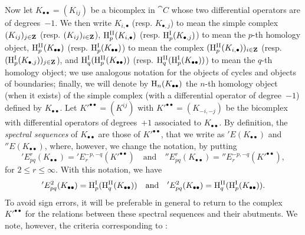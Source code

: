 \begin{env}[11.3.5]
\label{0.11.3.5}
Now let $K_{\bullet\bullet} = (K_{ij})$ be a bicomplex in $\cat{C}$ whose two differential operators are of degrees~$-1$.
We then write $K_{i,\bullet}$ (resp. $K_{\bullet,j}$) to mean the simple complex $(K_{ij})_{j\in\mathbf{Z}}$ (resp. $(K_{ij})_{i\in\mathbf{Z}}$), $\mathrm{H}_{p}^\mathrm{II}(K_{i, \bullet})$ (resp. $\mathrm{H}_{p}^\mathrm{I}(K_{\bullet, j})$) to mean the $p$-th homology object, $\mathrm{H}_{p}^\mathrm{II}(K_{\bullet\bullet})$ (resp. $\mathrm{H}_{p}^\mathrm{I}(K_{\bullet\bullet})$) to mean the complex $(\mathrm{H}_{p}^\mathrm{II}(K_{i, \bullet}))_{i \in\mathbf{Z}}$ (resp. $(\mathrm{H}_{p}^\mathrm{I}(K_{\bullet, j}))_{j \in\mathbf{Z}}$), and $\mathrm{H}_q^\mathrm{I}(\mathrm{H}_{p}^\mathrm{II}(K_{\bullet\bullet}))$ (resp. $\mathrm{H}_q^\mathrm{II}(\mathrm{H}_{p}^\mathrm{I}(K_{\bullet\bullet}))$) to mean the $q$-th homology object;
we use analogous notation for the objects of cycles and objects of boundaries;
finally, we will denote by $\mathrm{H}_n(K_{\bullet\bullet})$ the $n$-th homology object (when it exists) of the simple complex (with a differential operator of degree~$-1$) defined by $K_{\bullet\bullet}$.
Let $K'^{\bullet\bullet} = (K^{ij})$ with $K'^{\bullet\bullet} = (K_{-i,-j})$ be the bicomplex with differential operators of degrees~$+1$ associated to $K_{\bullet\bullet}$.
By definition, the \emph{spectral sequences} of $K_{\bullet\bullet}$ are those of $K'^{\bullet\bullet}$, that we write as $'E(K_{\bullet\bullet})$ and $''E(K_{\bullet\bullet})$, where, however, we change the notation, by putting
\[
  'E_{pq}^{r}(K_{\bullet\bullet})
  = 'E_{r}^{-p,-q}(K'^{\bullet\bullet})
  \quad\text{and}\quad
  ''E_{pq}^{r}(K_{\bullet\bullet})
  = ''E_{r}^{-p,-q}(K'^{\bullet\bullet}), 
\]
for $2\leq r \leq \infty$.
With this notation, we have
\[
  'E_{pq}^{2}(K_{\bullet\bullet})
  = \mathrm{H}_{p}^\mathrm{I}(\mathrm{H}_{q}^\mathrm{II}(K_{\bullet\bullet}))
  \quad\text{and}\quad
  'E_{pq}^{2}(K_{\bullet\bullet})
  = \mathrm{H}_{q}^\mathrm{II}(\mathrm{H}_{p}^\mathrm{I}(K_{\bullet\bullet})).
\]
To avoid sign errors, it will be preferable in general to return to the complex $K'^{\bullet\bullet}$ for the relations between these spectral sequences and their abutments.
We note, however, the criteria corresponding to :
\end{env}

